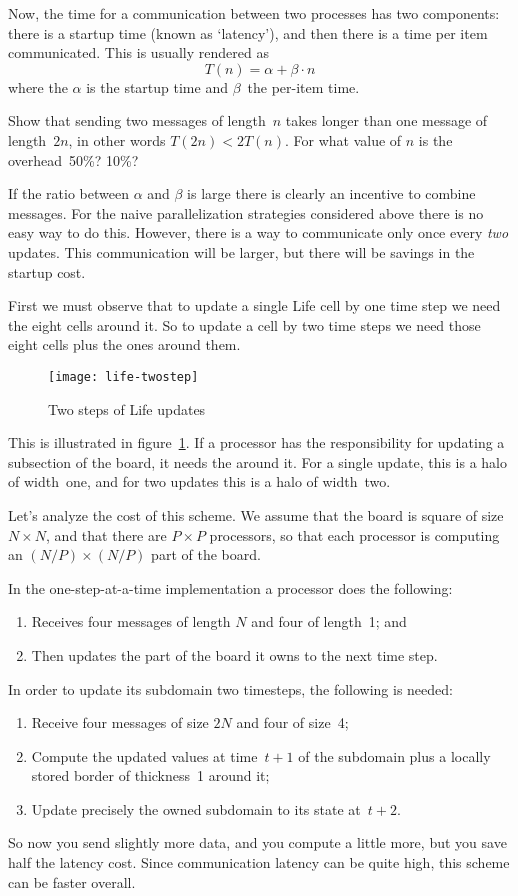 Now, the time for a communication between two processes has two components:
there is a startup time (known as `latency'), and then there is a time
per item communicated. This is usually rendered as
\[ T(n) = \alpha+\beta\cdot n \]
where the $\alpha$ is the startup time and $\beta$~the per-item time.
 
\begin{exercise}
  Show that sending two messages of length~$n$ takes longer
  than one message of length~$2n$, in other words $T(2n)<2T(n)$.
  For what value of $n$ is the overhead~50\%? 10\%?
\end{exercise}

If the ratio between $\alpha$ and $\beta$ is large there is clearly
an incentive to combine messages. For the naive parallelization
strategies considered above there is no easy way to do this.
However, there is a way to communicate only once every \emph{two} 
updates. This communication will be larger, but there
will be savings in the startup cost.

First we must observe that to update a single Life cell 
by one time step we need the eight cells around it. So to update
a cell by two time steps we need those eight cells plus the ones around them.
\begin{figure}[ht]
  \texttt{[image: life-twostep]}
  \caption{Two steps of Life updates}
  \label{fig:twostep}
\end{figure}
This is illustrated in figure~\ref{fig:twostep}.
If a processor has the responsibility for updating a subsection of the board,
it needs the 
around it. For a single update, this is a halo of width~one, and
for two updates this is a halo of width~two.

Let's analyze the cost of this scheme. We assume that the board is
square of size $N\times N$, and that there are $P\times P$ processors,
so that each processor is computing an $(N/P)\times(N/P)$ part of the board.

In the one-step-at-a-time implementation a processor does the following:
\begin{enumerate}
\item Receives four messages of length $N$ and four of length~1; and
\item Then updates the part of the board it owns to the next time step.
\end{enumerate}
In order to update its subdomain two timesteps, the following is needed:
\begin{enumerate}
\item Receive four messages of size $2 N$ and four of size~4;
\item Compute the updated values at time~$t+1$ of the subdomain plus
  a locally stored border of thickness~1 around it;
\item Update precisely the owned subdomain to its state at~$t+2$.
\end{enumerate}
So now you send slightly more data, and you compute a little more,
but you save half the latency cost. Since communication latency can 
be quite high, this scheme can be faster overall.


